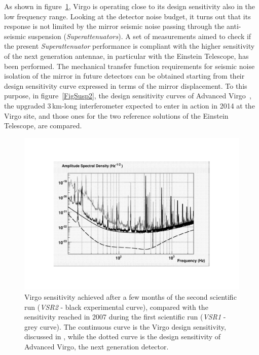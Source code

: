 As shown in figure~\ref{FigSusp1}, Virgo is operating close to its design sensitivity also in the low frequency range. Looking at the detector noise budget, it turns out that its response is not limited by the mirror seismic noise passing through the anti-seismic suspension (\emph{Superattenuators}). A set of measurements aimed to check if the present \emph{Superattenuator} performance is compliant with the higher sensitivity of the next generation antennae, in particular with the Einstein Telescope, has been performed. 
The mechanical transfer function requirements for seismic noise isolation of the mirror in future detectors can be obtained starting from their design sensitivity curve expressed in terms of the mirror displacement. To this purpose, in figure~\ref{FigSusp2}, the design sensitivity curves of Advanced Virgo~\cite{AdV2009}, the upgraded 3\,km-long interferometer expected to enter in action in 2014 at the Virgo site, and those ones for the two reference solutions of the Einstein Telescope, are compared.
%   
\begin{figure}[t!]
	\begin{center}
		 \includegraphics[width=18cm]{./Sec_Suspensions/Figures/Fig1.pdf}
			\caption{Virgo sensitivity achieved after a few months of the second   scientific run (\emph{VSR2} - black experimental curve), compared with the sensitivity reached in 2007 during the first scientific run (\emph{VSR1} - grey curve). The continuous curve is the Virgo design sensitivity, discussed in \cite{Punturo2004}, while the dotted curve is the design sensitivity of Advanced Virgo, the next generation detector.}
\label{FigSusp1}
	\end{center}
\end{figure}
